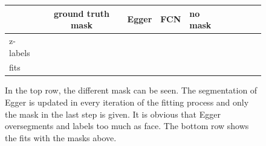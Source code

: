 \begin{figure}[H]
	\begin{tabular}{m{1.3cm}|SC|SC|SC|SC}
		& \parbox{2cm}{ground truth mask}& Egger & FCN & no mask\\ \hline
		z-labels &  &
		 &
		 & \\ \hline
		fits &  &
		 &
		 &
		 \\
	\end{tabular}
	\caption{In the top row, the different mask can be seen. The segmentation of Egger is updated in every iteration of the fitting process and only the mask in the last step is given. It is obvious that Egger oversegments and labels too much as face. The bottom row shows the fits with the masks above.}
	\label{fig:chap3:zlabelsandfits_setting2}
\end{figure}

